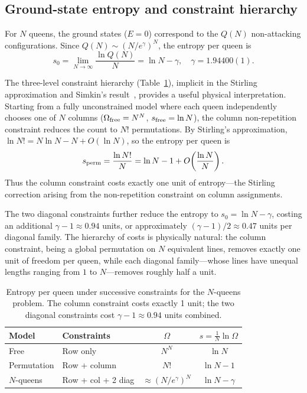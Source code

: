 \documentclass[aps, pre, reprint, amsmath, amssymb, superscriptaddress, floatfix]{revtex4-2}
\begin{document}
\subsection{Ground-state entropy and constraint hierarchy}
\label{sec:entropy}

For $N$ queens, the ground states ($E = 0$) correspond to the
$Q(N)$ non-attacking configurations.  Since
$Q(N) \sim (N/e^\gamma)^N$, the entropy per queen is
\begin{equation}
  s_0 = \lim_{N\to\infty}\frac{\ln Q(N)}{N}
  = \ln N - \gamma, \quad \gamma = 1.94400(1).
  \label{eq:s0}
\end{equation}

The three-level constraint hierarchy (Table~\ref{tab:entropy_levels}),
implicit in the Stirling approximation and Simkin's
result~\cite{Simkin2022,Knuth2022},
provides a useful physical interpretation.  Starting from a fully
unconstrained model where each queen independently chooses one of $N$
columns ($\Omega_{\rm free} = N^N$, $s_{\rm free} = \ln N$), the
column non-repetition constraint reduces the count to $N!$
permutations.  By Stirling's approximation,
$\ln N! = N\ln N - N + O(\ln N)$, so the entropy per queen is
\begin{equation}
  s_{\rm perm} = \frac{\ln N!}{N}
  = \ln N - 1 + O\!\left(\frac{\ln N}{N}\right).
  \label{eq:s_perm}
\end{equation}
Thus the column constraint costs exactly one unit of entropy---the
Stirling correction arising from the non-repetition constraint on
column assignments.

The two diagonal constraints further reduce the entropy to
$s_0 = \ln N - \gamma$, costing an additional $\gamma - 1 \approx
0.94$ units, or approximately $(\gamma - 1)/2 \approx 0.47$ units
per diagonal family.  The hierarchy of costs is physically natural:
the column constraint, being a global permutation on $N$ equivalent
lines, removes exactly one unit of freedom per queen, while each
diagonal family---whose lines have unequal lengths ranging from $1$
to $N$---removes roughly half a unit.

\begin{table}[t]
  \caption{Entropy per queen under successive constraints for the
  $N$-queens problem.  The column constraint costs exactly 1 unit;
  the two diagonal constraints cost $\gamma - 1 \approx 0.94$ units
  combined.}
  \label{tab:entropy_levels}
  \begin{ruledtabular}
  \begin{tabular}{llcc}
    Model & Constraints & $\Omega$ & $s = \frac{1}{N}\ln\Omega$ \\
    \midrule
    Free & Row only & $N^N$ & $\ln N$ \\
    Permutation & Row + column & $N!$ & $\ln N - 1$ \\
    $N$-queens & Row + col + 2 diag & $\approx (N/e^\gamma)^N$
      & $\ln N - \gamma$ \\
  \end{tabular}
  \end{ruledtabular}
\end{table}
\end{document}
